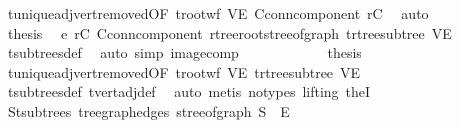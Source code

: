 \begin{isabellebody}
\ t{\isachardot}{\kern0pt}unique{\isacharunderscore}{\kern0pt}adj{\isacharunderscore}{\kern0pt}vert{\isacharunderscore}{\kern0pt}removed{\isacharbrackleft}{\kern0pt}OF\ t{\isachardot}{\kern0pt}root{\isacharunderscore}{\kern0pt}wf\ VE{\isacharprime}{\kern0pt}\ C{\isacharunderscore}{\kern0pt}conn{\isacharunderscore}{\kern0pt}component{\isacharbrackright}{\kern0pt}\ {\isacartoucheopen}r{\isacharprime}{\kern0pt}{\isasymin}C{\isacartoucheclose}\ \isamarkupfalse%
\ auto\isanewline
\ \ \ \ \ \ \isamarkupfalse%
\ \isamarkupfalse%
\ {\isacharquery}{\kern0pt}thesis\ \isamarkupfalse%
\ e\ {\isacartoucheopen}r{\isacharprime}{\kern0pt}{\isasymin}C{\isacartoucheclose}\ C{\isacharunderscore}{\kern0pt}conn{\isacharunderscore}{\kern0pt}component\ rtree{\isachardot}{\kern0pt}root{\isacharunderscore}{\kern0pt}stree{\isacharunderscore}{\kern0pt}of{\isacharunderscore}{\kern0pt}graph\ t{\isachardot}{\kern0pt}rtree{\isacharunderscore}{\kern0pt}subtree\ VE{\isacharprime}{\kern0pt}\ \isamarkupfalse%
\ t{\isachardot}{\kern0pt}subtrees{\isacharunderscore}{\kern0pt}def\ \isamarkupfalse%
\ {\isacharparenleft}{\kern0pt}auto\ simp{\isacharcolon}{\kern0pt}\ image{\isacharunderscore}{\kern0pt}comp{\isacharparenright}{\kern0pt}\isanewline
\ \ \ \ \isamarkupfalse%
\isanewline
\ \ \ \ \isamarkupfalse%
\ \isamarkupfalse%
\ {\isacharquery}{\kern0pt}thesis\ \isamarkupfalse%
\ t{\isachardot}{\kern0pt}unique{\isacharunderscore}{\kern0pt}adj{\isacharunderscore}{\kern0pt}vert{\isacharunderscore}{\kern0pt}removed{\isacharbrackleft}{\kern0pt}OF\ t{\isachardot}{\kern0pt}root{\isacharunderscore}{\kern0pt}wf\ VE{\isacharprime}{\kern0pt}{\isacharbrackright}{\kern0pt}\ t{\isachardot}{\kern0pt}rtree{\isacharunderscore}{\kern0pt}subtree\ VE{\isacharprime}{\kern0pt}\isanewline
\ \ \ \ \ \ \isamarkupfalse%
\ t{\isachardot}{\kern0pt}subtrees{\isacharunderscore}{\kern0pt}def\ t{\isachardot}{\kern0pt}vert{\isacharunderscore}{\kern0pt}adj{\isacharunderscore}{\kern0pt}def\ \isamarkupfalse%
\ {\isacharparenleft}{\kern0pt}auto{\isacharcomma}{\kern0pt}\ metis\ {\isacharparenleft}{\kern0pt}no{\isacharunderscore}{\kern0pt}types{\isacharcomma}{\kern0pt}\ lifting{\isacharparenright}{\kern0pt}\ theI{\isacharparenright}{\kern0pt}\isanewline
\ \ \isamarkupfalse%
\isanewline
\ \ \isamarkupfalse%
\ {\isachardoublequoteopen}{\isacharparenleft}{\kern0pt}{\isasymUnion}S{\isasymin}t{\isachardot}{\kern0pt}subtrees{\isachardot}{\kern0pt}\ tree{\isacharunderscore}{\kern0pt}graph{\isacharunderscore}{\kern0pt}edges\ {\isacharparenleft}{\kern0pt}stree{\isacharunderscore}{\kern0pt}of{\isacharunderscore}{\kern0pt}graph\ S{\isacharparenright}{\kern0pt}{\isacharparenright}{\kern0pt}\ {\isacharequal}{\kern0pt}\ E{\isacharprime}{\kern0pt}{\isachardoublequoteclose}\ \isanewline

\end{isabellebody}
